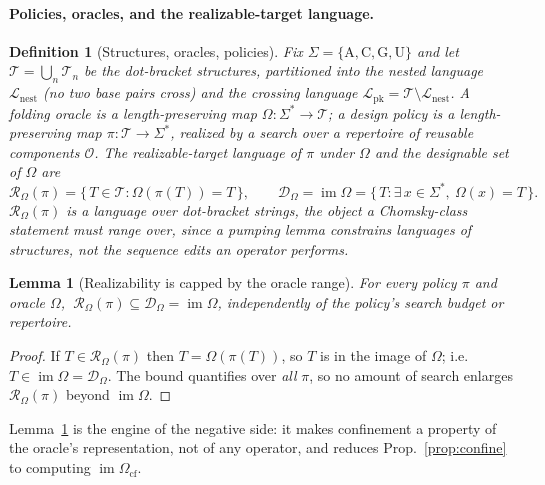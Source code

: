 \documentclass[11pt]{article}
\newtheorem{lemma}{Lemma}
\newtheorem{definition}{Definition}
\newcommand{\NESTED}{\ensuremath{\mathcal{L}_{\mathrm{nest}}}}
\newcommand{\PK}{\ensuremath{\mathcal{L}_{\mathrm{pk}}}}
\newcommand{\Ocf}{\ensuremath{\Omega_{\mathrm{cf}}}}
\newcommand{\Rze}[2]{\ensuremath{\mathcal{R}_{#1}(#2)}}
\begin{document}
\paragraph{Policies, oracles, and the realizable-target language.}
\begin{definition}[Structures, oracles, policies]\label{def:setup}
Fix $\Sigma=\{\mathrm A,\mathrm C,\mathrm G,\mathrm U\}$ and let $\mathcal T=\bigcup_n\mathcal T_n$ be the
dot-bracket structures, partitioned into the \emph{nested} language $\NESTED$ (no two base pairs cross) and
the \emph{crossing} language $\PK=\mathcal T\setminus\NESTED$. A \emph{folding oracle} is a length-preserving
map $\Omega:\Sigma^\ast\!\to\mathcal T$; a \emph{design policy} is a length-preserving map
$\pi:\mathcal T\!\to\Sigma^\ast$, realized by a search over a repertoire of reusable components $\mathcal O$.
The \emph{realizable-target language} of $\pi$ under $\Omega$ and the \emph{designable set} of $\Omega$ are
\begin{equation}\label{eq:realizable}
  \Rze{\Omega}{\pi}=\{\,T\in\mathcal T:\Omega(\pi(T))=T\,\},\qquad
  \mathcal D_\Omega=\operatorname{im}\Omega=\{\,T:\exists\,x\in\Sigma^\ast,\ \Omega(x)=T\,\}.
\end{equation}
$\Rze{\Omega}{\pi}$ is a language over dot-bracket strings, the object a Chomsky-class statement must range
over, since a pumping lemma constrains languages of \emph{structures}, not the sequence edits an operator
performs.
\end{definition}

\begin{lemma}[Realizability is capped by the oracle range]\label{lem:bound}
For every policy $\pi$ and oracle $\Omega$, $\ \Rze{\Omega}{\pi}\subseteq\mathcal D_\Omega=\operatorname{im}\Omega$,
independently of the policy's search budget or repertoire.
\end{lemma}
\begin{proof}
If $T\in\Rze{\Omega}{\pi}$ then $T=\Omega(\pi(T))$, so $T$ is in the image of $\Omega$; i.e.\
$T\in\operatorname{im}\Omega=\mathcal D_\Omega$. The bound quantifies over \emph{all} $\pi$, so no amount of
search enlarges $\Rze{\Omega}{\pi}$ beyond $\operatorname{im}\Omega$.
\end{proof}
\noindent Lemma~\ref{lem:bound} is the engine of the negative side: it makes confinement a property of the
oracle's representation, not of any operator, and reduces Prop.~\ref{prop:confine} to computing
$\operatorname{im}\Ocf$.
\end{document}
